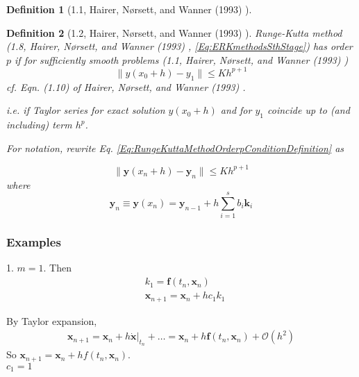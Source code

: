 \documentclass[10pt]{amsart}
\newtheorem{definition}{Definition}
\begin{document}
\begin{multicols*}{2}
\begin{definition}[1.1, Hairer, N\o rsett, and Wanner (1993) \cite{HNW1993}]
\end{definition}

\begin{definition}[1.2, Hairer, N\o rsett, and Wanner (1993) \cite{HNW1993}]
	Runge-Kutta method (1.8, Hairer, N\o rsett, and Wanner (1993) \cite{HNW1993}, \ref{Eq:ERKmethodsSthStage}) has order $p$ if for sufficiently smooth problems (1.1, Hairer, N\o rsett, and Wanner (1993) \cite{HNW1993})
\begin{equation}\label{Eq:RungeKuttaMethodOrderpConditionDefinition}
	\| y(x_0 + h) - y_1 \| \leq K h^{p + 1}
\end{equation}
cf. Eqn. (1.10) of Hairer, N\o rsett, and Wanner (1993) \cite{HNW1993}.

i.e. if Taylor series for exact solution $y(x_0 + h)$ and for $y_1$ coincide up to (and including) term $h^p$.

For notation, rewrite Eq. \ref{Eq:RungeKuttaMethodOrderpConditionDefinition} as

\begin{equation}
	\| \mathbf{y}(x_n + h) - \mathbf{y}_n \| \leq Kh^{p+1}
\end{equation}
where
\begin{equation}
\mathbf{y}_n \equiv \mathbf{y}(x_n) = \mathbf{y}_{n-1} + h \sum_{i=1}^{s} b_i \mathbf{k}_i
\end{equation}

\end{definition}




\subsubsection{Examples}

1. $m = 1$. Then 
\[
\begin{aligned}
	& k_1 = \mathbf{f}(t_n, \mathbf{x}_n) \\
	& \mathbf{x}_{n+1} = \mathbf{x}_n + hc_1 k_1
\end{aligned}
\]

By Taylor expansion,
\[
\begin{gathered}
	\mathbf{x}_{n+1} = \mathbf{x}_n + h \left. \dot{\mathbf{x}} \right|_{t_n} + \dots = \mathbf{x}_n + h \mathbf{f}(t_n, \mathbf{x}_n) + \mathcal{O}(h^2)
\end{gathered}
\]
So $\mathbf{x}_{n+1} = \mathbf{x}_n + h f(t_n, \mathbf{x}_n)$.  \\

$c_1= 1$ 


\end{multicols*}
\end{document}
